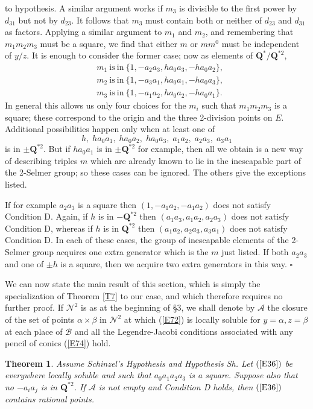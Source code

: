 \documentclass[12pt]{article}
\def\bQ{{\mathbf Q}}
\def\ga{{\alpha}}
\def\gb{{\beta}}
\def\sA{{\mathcal A}}
\def\sB{{\mathcal B}}
\def\sN{{\mathcal N}}
\def\Sha{\mbox{\wncyr Sh}}
\def\qed{{\hfill$\square$}}
\def\bth{\begin{theorem} \label}
\def\eth{\end{theorem}}
\newtheorem{theorem}{Theorem}
\begin{document}
to hypothesis. A similar argument works if $m_3$ is divisible
to the first power by $d_{31}$ but not by $d_{23}$. It
follows that $m_3$ must contain both or neither of
$d_{23}$ and $d_{31}$ as factors. Applying a similar argument
to $m_1$ and $m_2$, and remembering that $m_1m_2m_3$ must be
a square, we find that either $m$ or $mm^0$ must be
independent of $y/z$. It is enough to consider the former
case; now as elements of $\bQ^*/\bQ^{*2}$,
\begin{align*}
 & m_1 \mathrm{~is~in~} \{1,-a_2a_3,ha_0a_3,-ha_0a_2\}, \\
 & m_2 \mathrm{~is~in~} \{1,-a_3a_1,ha_0a_1,-ha_0a_3\}, \\
 & m_3 \mathrm{~is~in~} \{1,-a_1a_2,ha_0a_2,-ha_0a_1\}.
\end{align*}
In general this allows us only four choices for the $m_i$ such
that $m_1m_2m_3$ is a square; these correspond to the origin
and the three 2-division points on $E$. Additional
possibilities happen only when at least one of
\[ h,\;ha_0a_1,\;ha_0a_2,\;ha_0a_3,\;a_1a_2,\;a_2a_3,\;a_3a_1 \]
is in $\pm\bQ^{*2}$. But if $ha_0a_1$ is in $\pm\bQ^{*2}$ for
example, then all we obtain is a new way of describing triples
$m$ which are already known to lie in the inescapable part
of the 2-Selmer group; so these cases can be ignored. The
others give the exceptions listed.

If for example $a_2a_3$ is a square then $(1,-a_1a_2,-a_1a_2)$
does not satisfy Condition D. Again, if $h$ is in $-\bQ^{*2}$
then $(a_1a_3,a_1a_2,a_2a_3)$ does not satisfy Condition D,
whereas if $h$ is in $\bQ^{*2}$ then $(a_1a_2,a_2a_3,a_3a_1)$
does not satisfy Condition D. In each of these cases, the
group of inescapable elements of the 2-Selmer group acquires
one extra generator which is the $m$ just listed. If both
$a_2a_3$ and one of $\pm h$ is a square, then we acquire two
extra generators in this way.  \qed

We can now state the main result of this section, which is
simply the specialization of Theorem \ref{T7} to our case, and
which therefore requires no further proof. If $\sN^2$ is as
at the beginning of \S3, we shall denote by $\sA$ the closure
of the set of points $\ga\times\gb$ in $\sN^2$ at which
(\ref{E72}) is locally soluble for $y=\ga,z=\gb$ at each
place of $\sB$
and all the Legendre-Jacobi conditions associated with
any pencil of conics (\ref{E74}) hold.
\bth{T9} Assume Schinzel's Hypothesis and Hypothesis \Sha. Let
$(\ref{E36})$ be everywhere locally soluble and such that
$a_0a_1a_2a_3$ is a square. Suppose also that no $-a_ia_j$ is
in $\bQ^{*2}$. If $\sA$ is not empty and
Condition D holds, then $(\ref{E36})$ contains rational points.
\eth
\end{document}
